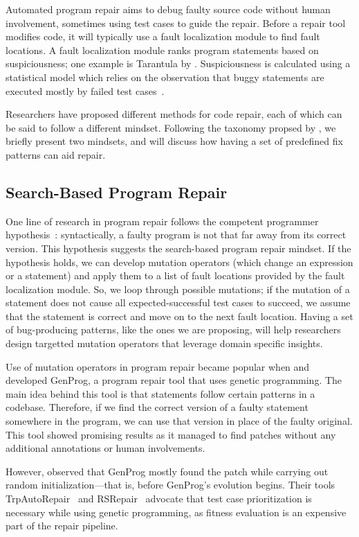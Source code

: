 Automated program repair aims to debug faulty source code without human involvement, sometimes using test cases to guide the repair. Before a repair tool modifies code, it will typically use a fault localization module to find fault locations. A fault localization module ranks program statements based on suspiciousness; one example is Tarantula by \cite{jones2005empirical}. Suspiciousness is calculated using a statistical model which relies on the observation that buggy statements are executed mostly by failed test cases~\citep{naish2009spectral,xie2013theoretical}.

Researchers have proposed different methods for code repair, each of which can be said to follow a different mindset. Following the taxonomy propsed by \cite{liu2018survey}, we briefly present two mindsets, and will discuss how having a set of predefined fix patterns can aid repair.

\subsection{Search-Based Program Repair}
One line of research in program repair follows the competent programmer hypothesis~\citep{gopinath2014mutant}: syntactically, a faulty program is not that far away from its correct version. This hypothesis suggests the search-based program repair mindset. If the hypothesis holds, we can develop mutation operators (which change an expression or a statement) and apply them to a list of fault locations provided by the fault localization module. So, we loop through possible mutations; if the mutation of a statement does not cause all expected-successful test cases to succeed, we assume that the statement is correct and move on to the next fault location. Having a set of bug-producing patterns, like the ones we are proposing, will help researchers design targetted mutation operators that leverage domain specific insights.

Use of mutation operators in program repair became popular when \cite{forrest2009genetic} and \cite{nguyen2009using} developed GenProg, a program repair tool that uses genetic programming. The main idea behind this tool is that statements follow certain patterns in a codebase. Therefore, if we find the correct version of a faulty statement somewhere in the program, we can use that version in place of the faulty original. This tool showed promising results as it managed to find patches without any additional annotations or human involvements.

However, \cite{arcuri2011practical} observed that GenProg mostly found the patch while carrying out random initialization---that is, before GenProg's evolution begins. Their tools TrpAutoRepair~\citep{qi2013efficient} and RSRepair~\citep{qi2014strength} advocate that test case prioritization is necessary while using genetic programming, as fitness evaluation is an expensive part of the repair pipeline.

